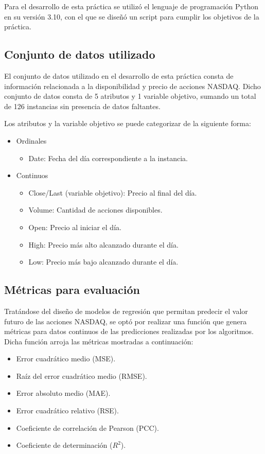 Para el desarrollo de esta práctica se utilizó el lenguaje de programación Python en su versión 3.10, con el que se diseñó un script para cumplir los objetivos de la práctica.


\subsection{Conjunto de datos utilizado}
El conjunto de datos utilizado en el desarrollo de esta práctica consta de información relacionada a la disponibilidad y precio de acciones NASDAQ. Dicho conjunto de datos consta de 5 atributos y 1 variable objetivo, sumando un total de 126 instancias sin presencia de datos faltantes.

Los atributos y la variable objetivo se puede categorizar de la siguiente forma:

\begin{itemize}
	\item Ordinales
		\begin{itemize}
			\item Date: Fecha del día correspondiente a la instancia.
		\end{itemize}
	\item Continuos
		\begin{itemize}
			\item Close/Last (variable objetivo): Precio al final del día.
			\item Volume: Cantidad de acciones disponibles.
			\item Open: Precio al iniciar el día.
			\item High: Precio más alto alcanzado durante el día.
			\item Low: Precio más bajo alcanzado durante el día.
		\end{itemize}
\end{itemize}


\subsection{Métricas para evaluación}
Tratándose del diseño de modelos de regresión que permitan predecir el valor futuro de las acciones NASDAQ, se optó por realizar una función que genera métricas para datos continuos de las predicciones realizadas por los algoritmos. Dicha función arroja las métricas mostradas a continuación:

\begin{itemize}
	\item Error cuadrático medio (MSE).
	\item Raíz del error cuadrático medio (RMSE).
	\item Error absoluto medio (MAE).
	\item Error cuadrático relativo (RSE).
	\item Coeficiente de correlación de Pearson (PCC).
	\item Coeficiente de determinación ($R^2$).
\end{itemize}


